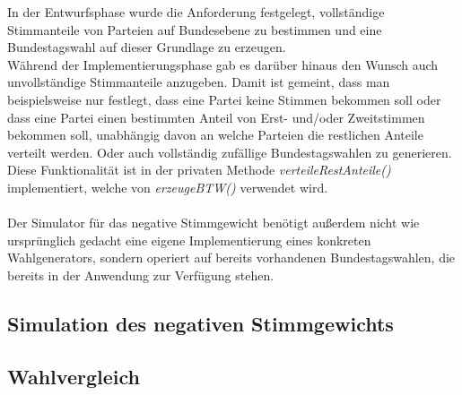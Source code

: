 \documentclass[12pt,a4paper,titlepage]{article}
\newcommand{\mymo}{\fontfamily{pcr}\selectfont \textit}
\begin{document}
In der Entwurfsphase wurde die Anforderung festgelegt, vollständige Stimmanteile von Parteien auf Bundesebene zu bestimmen und eine Bundestagswahl auf dieser Grundlage zu erzeugen.\\
Während der Implementierungsphase gab es darüber hinaus den Wunsch auch unvollständige Stimmanteile anzugeben. Damit ist gemeint, dass man beispielsweise nur festlegt, dass eine Partei keine Stimmen bekommen soll oder dass eine Partei einen bestimmten Anteil von Erst- und/oder Zweitstimmen bekommen soll, unabhängig davon an welche Parteien die restlichen Anteile verteilt werden. Oder auch vollständig zufällige Bundestagswahlen zu generieren. Diese Funktionalität ist in der privaten Methode {\mymo{verteileRestAnteile()}} implementiert, welche von {\mymo{erzeugeBTW()}} verwendet wird.\\\\

Der Simulator für das negative Stimmgewicht benötigt außerdem nicht wie ursprünglich gedacht eine eigene Implementierung eines konkreten Wahlgenerators, sondern operiert auf bereits vorhandenen Bundestagswahlen, die bereits in der Anwendung zur Verfügung stehen.

	\subsection{Simulation des negativen Stimmgewichts}
		
	\subsection{Wahlvergleich}
	
\end{document}
